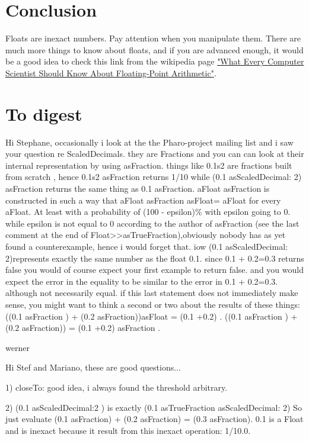 \documentclass[a4paper,10pt,twoside]{book}
\begin{document}
\section{Conclusion}
Floats are inexact numbers. Pay attention when you manipulate them.
There are much more things to know about floats, and if you are advanced enough, it would be a good idea to check this link from the wikipedia page \href{http://www.validlab.com/goldberg/paper.pdf}{"What Every Computer Scientist Should Know About Floating-Point Arithmetic"}.



\section{To digest}

Hi Stephane,
occasionally i look at the the Pharo-project mailing list and i saw your question re ScaledDecimals. they are Fractions and you can can look at their internal representation by using asFraction. things like 0.1s2 are fractions built from scratch , hence 0.1s2 asFraction returns 1/10 while (0.1 asScaledDecimal: 2) asFraction returns the same thing as 0.1 asFraction.
aFloat asFraction is constructed in such a way that
aFloat asFraction asFloat= aFloat
for every aFloat. At least with a probability of (100 - epsilon)\% with epsilon going to 0. while epsilon is not equal to 0 according to the author of asFraction (see the last comment at the end of Float>>asTrueFraction),obviously nobody has as yet found a counterexample, hence i would forget that.
iow (0.1 asScaledDecimal: 2)represents exactly the same number as the float 0.1.
since 0.1 + 0.2=0.3 returns false  you would of course expect your first example to return false. and you would expect the error in the equality to be similar to the error in 0.1 + 0.2=0.3. although not necessarily equal. if this last statement does not immediately make sense, you might want to think a second or two about the results of these things:
((0.1 asFraction ) + (0.2 asFraction))asFloat  = (0.1 +0.2) .
((0.1 asFraction ) + (0.2 asFraction))   = (0.1 +0.2) asFraction .

werner

Hi Stef and Mariano,
these are good questions...

1) closeTo: good idea, i always found the threshold arbitrary.

2) (0.1 asScaledDecimal:2 ) is exactly (0.1 asTrueFraction asScaledDecimal: 2)
So just evaluate (0.1 asFraction) + (0.2 asFraction) = (0.3 asFraction).
0.1 is a Float and is inexact because it result from this inexact
operation: 1/10.0.
\end{document}
